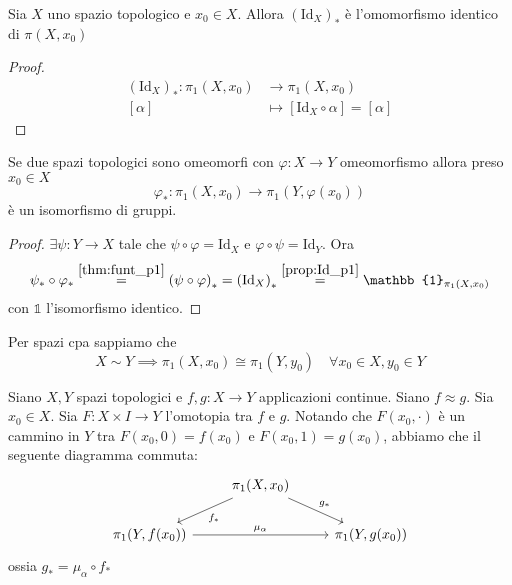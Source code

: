     \begin{proposition}\label{prop:Id_p1}
        Sia \(X\) uno spazio topologico e \(x_{0} \in X\). Allora
        \((\mathrm{Id}_X)_*\) è l'omomorfismo identico di
        \(\pi{(X, x_{0})}\) 
    \end{proposition}
    \begin{proof}
        \begin{align*}
            {(\mathrm{Id}_X)}_* : \pi_{1}{(X, x_{0})} &\to \pi_{1}{(X, x_{0})} \\
            [\alpha] &\mapsto [\mathrm{Id}_X \circ \alpha] = [\alpha]
        \end{align*}
    \end{proof}
    \begin{proposition}
        Se due spazi topologici sono omeomorfi con \(\varphi : X \to Y \)
        omeomorfismo allora preso \(x_{0} \in X\) 
        \[
          \varphi_* : \pi_{1}{(X, x_{0})} \to \pi_{1}{(Y, \varphi{(x_{0})})}
      \]
      è un isomorfismo di gruppi.
    \end{proposition}
    \begin{proof}
        \(\exists \psi  : Y \to X\) tale che \(\psi \circ \varphi  =
        \mathrm{Id}_X\) e \(\varphi \circ \psi = \mathrm{Id}_Y\). Ora
        \[
            \psi_* \circ \varphi_* \overset{\ref{thm:funt_p1}}{=} {(\psi \circ
            \varphi )}_* = {(\mathrm{Id}_X)}_* \overset{\ref{prop:Id_p1}}{=}
            \mathbb{1}_{\pi_{1}{(X, x_{0})}} 
        \]
        con \(\mathbb{1}\) l'isomorfismo identico.
    \end{proof}
    \begin{remark}
        Per spazi cpa sappiamo che
        \[
          X \sim Y \implies \pi_{1}{(X, x_{0})} \cong \pi_{1}{(Y, y_{0})} \quad
          \forall x_{0} \in X, y_{0} \in Y
        \]
    \end{remark}
    \begin{theorem}\label{thm:omotopia_p1}
        Siano \(X, Y\) spazi topologici e \(f, g : X \to Y\) applicazioni
        continue. Siano \(f \approx g\). Sia \(x_{0} \in X\). Sia \(F : X \times
        I \to Y\) l'omotopia tra \(f\)  e \(g\).
        Notando che \(F{(x_{0}, \cdot )}\) è un cammino in \(Y\) tra \(F{(x_{0},
        0)} = f{(x_{0})}\) e \(F{(x_{0}, 1)} = g{(x_{0})}\), abbiamo che il
        seguente diagramma commuta:
    \[\begin{tikzcd}
        & \pi_{1}{(X, x_{0})} \\
        \pi_{1}{(Y, f{(x_{0})})} && \pi_{1}{(Y, g{(x_{0})})}
        \arrow["{f_*}", from=1-2, to=2-1]
        \arrow["{g_*}", from=1-2, to=2-3]
        \arrow["{\mu_\alpha}", from=2-1, to=2-3]
    \end{tikzcd}\]
    ossia \(g_* = \mu_{\alpha} \circ f_* \) 
    \end{theorem}
